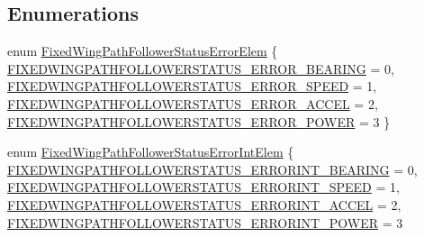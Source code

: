\subsection*{\-Enumerations}
\begin{DoxyCompactItemize}
\item 
enum \hyperlink{group___fixed_wing_path_follower_status_gaa5f2efdde3d7a0e1725d18f5e4cd9e2d}{\-Fixed\-Wing\-Path\-Follower\-Status\-Error\-Elem} \{ \hyperlink{group___fixed_wing_path_follower_status_ggaa5f2efdde3d7a0e1725d18f5e4cd9e2daf990b2affddb8aae8748d447932cbede}{\-F\-I\-X\-E\-D\-W\-I\-N\-G\-P\-A\-T\-H\-F\-O\-L\-L\-O\-W\-E\-R\-S\-T\-A\-T\-U\-S\-\_\-\-E\-R\-R\-O\-R\-\_\-\-B\-E\-A\-R\-I\-N\-G} = 0, 
\hyperlink{group___fixed_wing_path_follower_status_ggaa5f2efdde3d7a0e1725d18f5e4cd9e2da6938974cd1dec8824ed93dbde4543680}{\-F\-I\-X\-E\-D\-W\-I\-N\-G\-P\-A\-T\-H\-F\-O\-L\-L\-O\-W\-E\-R\-S\-T\-A\-T\-U\-S\-\_\-\-E\-R\-R\-O\-R\-\_\-\-S\-P\-E\-E\-D} = 1, 
\hyperlink{group___fixed_wing_path_follower_status_ggaa5f2efdde3d7a0e1725d18f5e4cd9e2dacdcc427a53b01c72dc75b77dbfe2669d}{\-F\-I\-X\-E\-D\-W\-I\-N\-G\-P\-A\-T\-H\-F\-O\-L\-L\-O\-W\-E\-R\-S\-T\-A\-T\-U\-S\-\_\-\-E\-R\-R\-O\-R\-\_\-\-A\-C\-C\-E\-L} = 2, 
\hyperlink{group___fixed_wing_path_follower_status_ggaa5f2efdde3d7a0e1725d18f5e4cd9e2dac9449ffcb33e82106d626c7659e2765f}{\-F\-I\-X\-E\-D\-W\-I\-N\-G\-P\-A\-T\-H\-F\-O\-L\-L\-O\-W\-E\-R\-S\-T\-A\-T\-U\-S\-\_\-\-E\-R\-R\-O\-R\-\_\-\-P\-O\-W\-E\-R} = 3
 \}
\item 
enum \hyperlink{group___fixed_wing_path_follower_status_gab786a350de6984a939c856e605be2774}{\-Fixed\-Wing\-Path\-Follower\-Status\-Error\-Int\-Elem} \{ \hyperlink{group___fixed_wing_path_follower_status_ggab786a350de6984a939c856e605be2774afb7490e13d766864a48c19ab1abe5f62}{\-F\-I\-X\-E\-D\-W\-I\-N\-G\-P\-A\-T\-H\-F\-O\-L\-L\-O\-W\-E\-R\-S\-T\-A\-T\-U\-S\-\_\-\-E\-R\-R\-O\-R\-I\-N\-T\-\_\-\-B\-E\-A\-R\-I\-N\-G} = 0, 
\hyperlink{group___fixed_wing_path_follower_status_ggab786a350de6984a939c856e605be2774a2b5026455d932e16e20858d877d3cbb9}{\-F\-I\-X\-E\-D\-W\-I\-N\-G\-P\-A\-T\-H\-F\-O\-L\-L\-O\-W\-E\-R\-S\-T\-A\-T\-U\-S\-\_\-\-E\-R\-R\-O\-R\-I\-N\-T\-\_\-\-S\-P\-E\-E\-D} = 1, 
\hyperlink{group___fixed_wing_path_follower_status_ggab786a350de6984a939c856e605be2774aed9276453711ba946527deb91812effe}{\-F\-I\-X\-E\-D\-W\-I\-N\-G\-P\-A\-T\-H\-F\-O\-L\-L\-O\-W\-E\-R\-S\-T\-A\-T\-U\-S\-\_\-\-E\-R\-R\-O\-R\-I\-N\-T\-\_\-\-A\-C\-C\-E\-L} = 2, 
\hyperlink{group___fixed_wing_path_follower_status_ggab786a350de6984a939c856e605be2774a6ef7527aad06e214b7a19c73579ec298}{\-F\-I\-X\-E\-D\-W\-I\-N\-G\-P\-A\-T\-H\-F\-O\-L\-L\-O\-W\-E\-R\-S\-T\-A\-T\-U\-S\-\_\-\-E\-R\-R\-O\-R\-I\-N\-T\-\_\-\-P\-O\-W\-E\-R} = 3

\end{DoxyCompactItemize}
